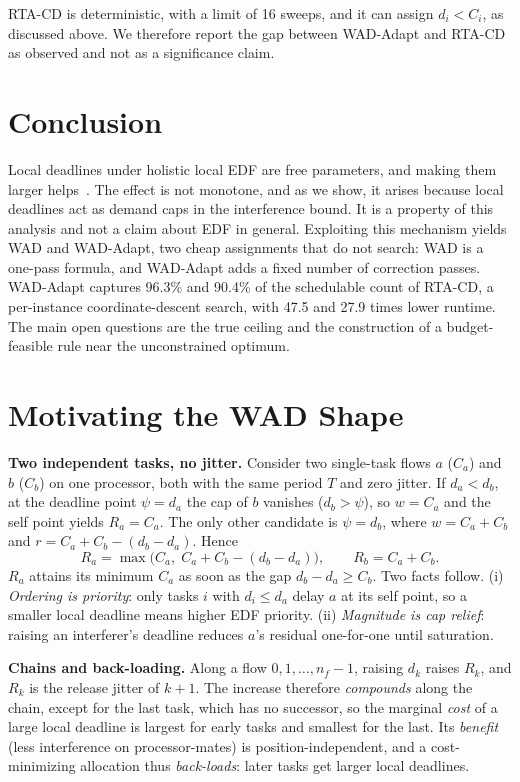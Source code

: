 \documentclass[conference]{IEEEtran}
\begin{document}
RTA-CD is deterministic, with a limit of 16 sweeps, and it can assign $d_i<C_i$,
as discussed above. We therefore report the gap between WAD-Adapt and RTA-CD as
observed and not as a significance claim.

\section{Conclusion}
\label{sec:conclusion}

Local deadlines under holistic local EDF are free parameters, and making them
larger helps~\cite{rivas15}. The effect is not monotone, and as we show, it arises
because local deadlines act as demand caps in the interference bound. It is a
property of this analysis and not a claim about EDF in general. Exploiting this
mechanism yields WAD and WAD-Adapt, two cheap assignments that do not search:
WAD is a one-pass formula, and WAD-Adapt adds a fixed number of correction
passes. WAD-Adapt captures 96.3\% and 90.4\% of the schedulable count of RTA-CD, a
per-instance coordinate-descent search, with 47.5 and 27.9 times lower runtime.
The main open questions are the true ceiling and the construction of a
budget-feasible rule near the unconstrained optimum.

\appendices
\section{Motivating the WAD Shape}
\label{app:deriv}

\smallskip\noindent\textbf{Two independent tasks, no jitter.} Consider two
single-task flows $a$ ($C_a$) and $b$ ($C_b$) on one processor, both with the
same period $T$ and zero jitter. If $d_a<d_b$, at the deadline point $\psi=d_a$
the cap of $b$ vanishes ($d_b>\psi$), so $w=C_a$ and the self point yields
$R_a=C_a$. The only other candidate is $\psi=d_b$, where $w=C_a+C_b$ and
$r=C_a+C_b-(d_b-d_a)$. Hence
\begin{equation}
R_a=\max\!\big(C_a,\; C_a+C_b-(d_b-d_a)\big),\qquad R_b=C_a+C_b .
\end{equation}
$R_a$ attains its minimum $C_a$ as soon as the gap $d_b-d_a\ge C_b$. Two facts
follow. (i) \emph{Ordering is priority}: only tasks $i$ with $d_i\le d_a$ delay
$a$ at its self point, so a smaller local deadline means higher EDF priority.
(ii) \emph{Magnitude is cap relief}: raising an interferer's deadline reduces
$a$'s residual one-for-one until saturation.

\smallskip\noindent\textbf{Chains and back-loading.} Along a flow
$0,1,\dots,n_f{-}1$, raising $d_k$ raises $R_k$, and $R_k$ is the release jitter of
$k{+}1$. The increase therefore \emph{compounds} along the chain, except for the
last task, which has no successor, so the marginal \emph{cost} of a large local
deadline is largest for early tasks and smallest for the last. Its \emph{benefit}
(less interference on processor-mates) is position-independent, and a
cost-minimizing allocation thus \emph{back-loads}: later tasks get larger local
deadlines.
\end{document}
